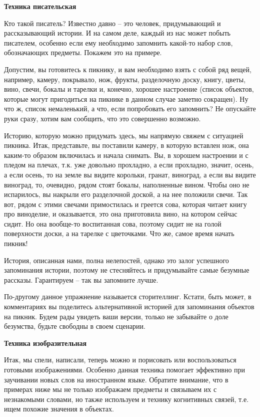 \textbf{Техника писательская}

Кто такой писатель? Известно давно – это человек, придумывающий и рассказывающий истории. И на самом деле, каждый из нас может побыть писателем, особенно если ему необходимо запомнить какой-то набор слов, обозначающих предметы. Покажем это на примере.

Допустим, вы готовитесь к пикнику, и вам необходимо взять с собой ряд вещей, например, камеру, покрывало, нож, фрукты, разделочную доску, книгу, цветы, вино, свечи, бокалы и тарелки и, конечно, хорошее настроение (список объектов, которые могут пригодиться на пикнике в данном случае заметно сокращен). Ну что ж, список немаленький, а что, если попробовать его запомнить? Не опускайте руки сразу, хотим вам сообщить, что это совершенно возможно.

Историю, которую можно придумать здесь, мы напрямую свяжем с ситуацией пикника. Итак, представьте, вы поставили камеру, в которую вставлен нож, она каким-то образом включилась и начала снимать. Вы, в хорошем настроении и с пледом на плечах, т.к. уже довольно прохладно, а если прохладно, значит, осень, а если осень, то на земле вы видите корольки, гранат, виноград, а если вы видите виноград, то, очевидно, рядом стоят бокалы, наполненные вином. Чтобы оно не испарилось, вы накрыли его разделочной доской, а на нее положили свечи. Так вот, рядом с этими свечами примостилась и греется сова, которая читает книгу про виноделие, и оказывается, это она приготовила вино, на котором сейчас сидит. Но она вообще-то воспитанная сова, поэтому сидит не на голой поверхности доски, а на тарелке с цветочками. Что же, самое время начать пикник!

История, описанная нами, полна нелепостей, однако это залог успешного запоминания истории, поэтому не стесняйтесь и придумывайте самые безумные рассказы. Гарантируем – так вы запомните лучше.

По-другому данное упражнение называется сторителлинг. Кстати, быть может, в комментариях вы поделитесь альтернативной историей для запоминания объектов на пикник. Будем рады увидеть ваши версии, только не забывайте о доле безумства, будьте свободны в своем сценарии.

\textbf{Техника изобразительная}

Итак, мы спели, написали, теперь можно и порисовать или воспользоваться готовыми изображениями. Особенно данная техника помогает эффективно при заучивании новых слов на иностранном языке. Обратите внимание, что в примерах ниже мы не только изображаем предметы и связываем их с незнакомыми словами, но также используем и технику когнитивных связей, т.е. ищем похожие значения в объектах.

